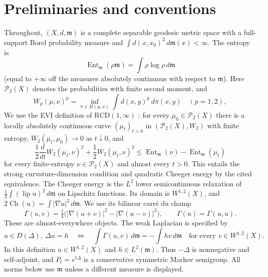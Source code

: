 \documentclass[12pt]{amsart}
\theoremstyle{definition}
\theoremstyle{remark}
\numberwithin{equation}{section}
\newcommand{\m}{\mathfrak m}
\newcommand{\RCD}{\mathrm{RCD}}
\theoremstyle{jpplain}
\begin{document}
\section{Preliminaries and conventions}

Throughout, $(X,d,\m)$ is a complete separable geodesic metric space with a
full-support Borel probability measure and
$\int d(x,x_0)^2\,d\m(x)<\infty$.  The entropy is
\[
 \operatorname{Ent}_{\m}(\rho\m)=\int\rho\log\rho\,d\m
\]
(equal to $+\infty$ off the measures absolutely continuous with respect to
$\m$).  Here $\mathcal P_2(X)$ denotes the probabilities with finite second
moment, and
\[
 W_p(\mu,\nu)^p=\inf_{\pi\in\Pi(\mu,\nu)}\int d(x,y)^p\,d\pi(x,y)
 \quad(p=1,2),
\]
We use the EVI definition of $\RCD(1,\infty)$
\cite[Definition 2.19 and Theorem 5.1]{en:AGS}: for every
$\mu_0\in\mathcal P_2(X)$ there is a locally absolutely continuous curve
$(\mu_t)_{t>0}$ in $(\mathcal P_2(X),W_2)$ with finite entropy,
$W_2(\mu_t,\mu_0)\to0$ as $t\downarrow0$, and
\[
 \frac12\frac{d}{dt}W_2(\mu_t,\nu)^2
 +\frac12W_2(\mu_t,\nu)^2
 \leq\operatorname{Ent}_{\m}(\nu)-\operatorname{Ent}_{\m}(\mu_t)
\]
for every finite-entropy $\nu\in\mathcal P_2(X)$ and almost every $t>0$.
This entails the strong curvature-dimension condition and quadratic
Cheeger energy by the cited equivalence.  The Cheeger energy is the
$L^2$ lower semicontinuous relaxation of
$\frac12\int(\operatorname{lip}u)^2\,d\m$ on Lipschitz functions.  Its domain
is $W^{1,2}(X)$, and $2\operatorname{Ch}(u)=\int|\nabla u|^2\,d\m$.
We use its bilinear carré du champ
\[
 \Gamma(u,v)=\tfrac14\bigl(|\nabla(u+v)|^2-|\nabla(u-v)|^2\bigr),
 \qquad\Gamma(u)=\Gamma(u,u).
\]
These are almost-everywhere objects.  The weak Laplacian is specified by
\begin{equation}\label{en:eq-generator}
 u\in D(\Delta),\ \Delta u=h
 \quad\Longleftrightarrow\quad
 \int\Gamma(u,v)\,d\m=-\int hv\,d\m
 \quad\text{for every }v\in W^{1,2}(X).
\end{equation}
In this definition $u\in W^{1,2}(X)$ and $h\in L^2(\m)$.
Thus $-\Delta$ is nonnegative and self-adjoint, and $P_t=e^{t\Delta}$ is a
conservative symmetric Markov semigroup.  All norms below use $\m$ unless a
different measure is displayed.
\end{document}
